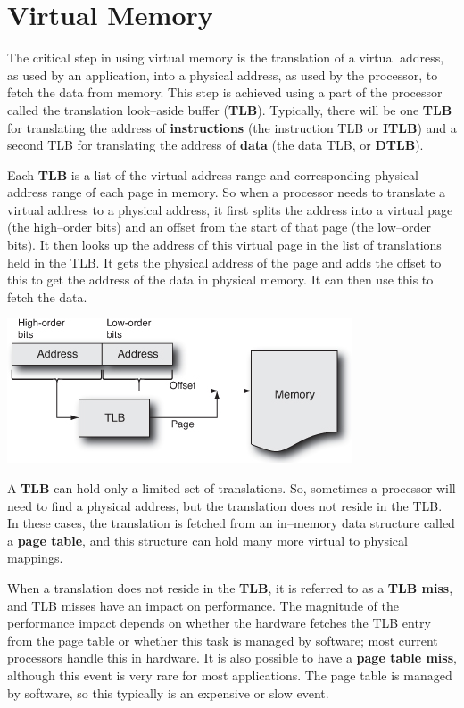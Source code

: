 \documentclass[12pt,a4paper]{report}
\begin{document}
\section{Virtual Memory}
The critical step in using virtual memory is the translation of a virtual address, as used by an application, into a physical address, as used by the processor, to fetch the data from memory. This step is achieved using a part of the processor called the translation look--aside buffer (\textbf{TLB}). Typically, there will be one \textbf{TLB} for translating the address of \textbf{instructions} (the instruction TLB or \textbf{ITLB}) and a second TLB for translating the address of \textbf{data} (the data TLB, or \textbf{DTLB}).
\par
Each \textbf{TLB} is a list of the virtual address range and corresponding physical address range of each page in memory. So when a processor needs to translate a virtual address to a physical address, it first splits the address into a virtual page (the high--order bits) and an offset from the start of that page (the low--order bits). It then looks up the address of this virtual page in the list of translations held in the TLB. It gets the physical address of the page and adds the offset to this to get the address of the data in physical memory. It can then use this to fetch the data.
\begin{center}
	\includegraphics{multicore_TLB.jpg}
\end{center}
A \textbf{TLB} can hold only a limited set of translations. So, sometimes a processor will need to find a physical address, but the translation does not reside in the TLB. In these cases, the translation is fetched from an in--memory data structure called a \textbf{page table}, and this structure can hold many more virtual to physical mappings. 
\par
When a translation does not reside in the \textbf{TLB}, it is referred to as a \textbf{TLB miss}, and TLB misses have an impact on performance. The magnitude of the performance impact depends on whether the hardware fetches the TLB entry from the page table or whether this task is managed by software; most current processors handle this in hardware. It is also possible to have a\textbf{ page table miss}, although this event is very rare for most applications. The page table is managed by software, so this typically is an expensive or slow event.
\end{document}
